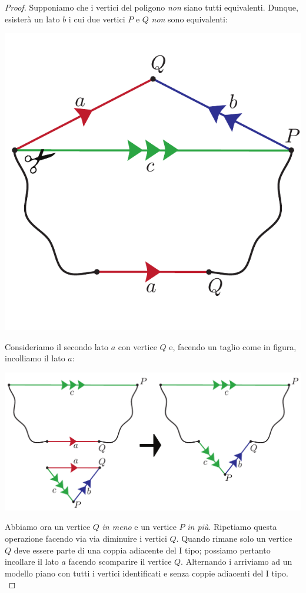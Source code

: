 \begin{proof}{}
Supponiamo che i vertici del poligono \textit{non} siano tutti equivalenti. Dunque, esisterà un lato $b$ i cui due vertici $P$ e $Q$ \textit{non} sono equivalenti:
\begin{center}
	\includegraphics[trim=0cm 0cm 0cm 0cm, clip, scale=0.35]{images/cutandpastealgorithmstep2-1.pdf}
\end{center}
Consideriamo il secondo lato $a$ con vertice $Q$ e, facendo un taglio come in figura, incolliamo il lato $a$:
\begin{center}
	\includegraphics[trim=0cm 0cm 0cm 0cm, clip, scale=0.35]{images/cutandpastealgorithmstep2-2.pdf}
\end{center}
Abbiamo ora un vertice $Q$ \textit{in meno} e un vertice $P$ \textit{in più}. Ripetiamo questa operazione facendo via via diminuire i vertici $Q$. Quando rimane solo un vertice $Q$ deve essere parte di una coppia adiacente del I tipo; possiamo pertanto incollare il lato $a$ facendo scomparire il vertice $Q$. Alternando i  arriviamo ad un modello piano con tutti i vertici identificati e senza coppie adiacenti del I tipo.\\

\end{proof}
